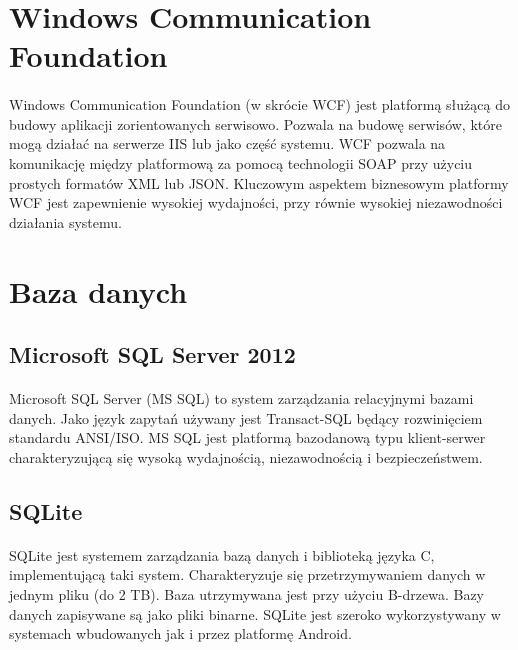 \section{ Windows Communication Foundation }
\label{sec:wcf}
\paragraph{}
Windows Communication Foundation (w skrócie WCF) jest platformą służącą do budowy aplikacji zorientowanych serwisowo. Pozwala na budowę serwisów, które mogą działać na serwerze IIS lub jako część systemu. WCF pozwala na komunikację między platformową za pomocą technologii SOAP przy użyciu prostych formatów XML lub JSON. Kluczowym aspektem biznesowym platformy WCF jest zapewnienie wysokiej wydajności, przy równie wysokiej niezawodności działania systemu.

\section{Baza danych}

\subsection{Microsoft SQL Server 2012}
\label{sub:mssql}
\paragraph{}
Microsoft SQL Server (MS SQL) to system zarządzania relacyjnymi bazami danych. Jako język zapytań używany jest Transact-SQL będący rozwinięciem standardu ANSI/ISO. MS SQL jest platformą bazodanową typu klient-serwer charakteryzującą się wysoką wydajnością, niezawodnością i bezpieczeństwem.

\subsection{SQLite} %
\label{sub:sqlite}
\paragraph{} %
SQLite jest systemem zarządzania bazą danych i biblioteką języka C, implementującą taki system. Charakteryzuje się przetrzymywaniem danych w jednym pliku (do 2 TB). Baza utrzymywana jest przy użyciu B-drzewa. Bazy danych zapisywane są jako pliki binarne. SQLite jest szeroko wykorzystywany w systemach wbudowanych jak i przez platformę Android.

